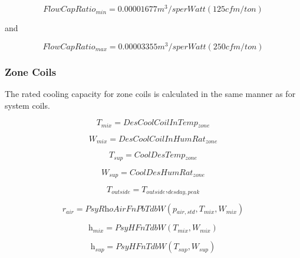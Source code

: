 \begin{equation}
FlowCapRatio_{min} = 0.00001677 m^{3}/s per Watt (125 cfm/ton)
\end{equation}

and

\begin{equation}
FlowCapRatio_{max} = 0.00003355 m^{3}/s per Watt (250 cfm/ton)
\end{equation}

\subsubsection{Zone Coils}\label{zone-coils-5}

The rated cooling capacity for zone coils is calculated in the same manner as for system coils.

\begin{equation}
\textit{T\(_{mix}\)} = \textit{DesCoolCoilInTemp\(_{zone}\)}
\end{equation}

\begin{equation}
\textit{W\(_{mix}\)} = \textit{DesCoolCoilInHumRat\(_{zone}\)}
\end{equation}

\begin{equation}
\textit{T\(_{sup}\)} = \textit{CoolDesTemp\(_{zone}\)}
\end{equation}

\begin{equation}
\textit{W\(_{sup}\)} = \textit{CoolDesHumRat\(_{zone}\)}
\end{equation}

\begin{equation}
\textit{T\(_{outside}\)} = \textit{T\(_{outside}\),\(_{desday,peak}\)}
\end{equation}

\begin{equation}
\textit{r\(_{air}\)} = \textit{PsyRhoAirFnPbTdbW}(\textit{p\(_{air,std}\)}, \textit{T\(_{mix}\)},\textit{W\(_{mix}\)})
\end{equation}

\begin{equation}
\textit{h\(_{mix}\)} = \textit{PsyHFnTdbW}(\textit{T\(_{mix}\)},\textit{W\(_{mix}\)})
\end{equation}

\begin{equation}
\textit{h\(_{sup}\)} = \textit{PsyHFnTdbW}(\textit{T\(_{sup}\)},\textit{W\(_{sup}\)})
\end{equation}


